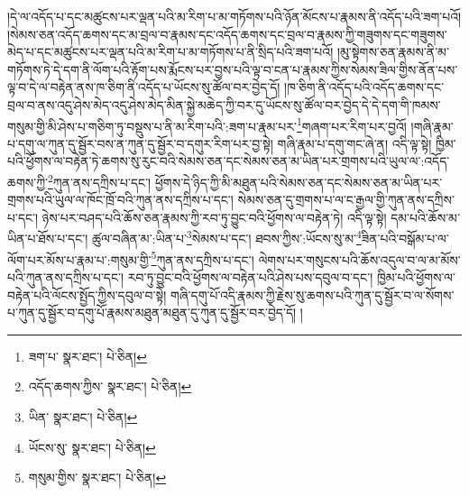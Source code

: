 །དེ་ལ་འདོད་པ་དང་མཚུངས་པར་ལྡན་པའི་མ་རིག་པ་མ་གཏོགས་པའི་ཉོན་མོངས་པ་རྣམས་ནི་འདོད་པའི་ཟག་པའོ། །སེམས་ཅན་འདོད་ཆགས་དང་མ་བྲལ་བ་རྣམས་དང་འདོད་ཆགས་དང་བྲལ་བ་རྣམས་ཀྱི་གཟུགས་དང་གཟུགས་མེད་པ་དང་མཚུངས་པར་ལྡན་པའི་མ་རིག་པ་མ་གཏོགས་པ་ནི་སྲིད་པའི་ཟག་པའོ། །མུ་སྟེགས་ཅན་རྣམས་ནི་མ་གཏོགས་ཏེ་དེ་དག་ནི་ལོག་པའི་རྟོག་པས་རྨོངས་པར་བྱས་པའི་ལྟ་བ་ངན་པ་རྣམས་ཀྱིས་སེམས་ཟིལ་གྱིས་ནོན་པས་ལྟ་བ་དེ་ལ་བརྟེན་ནས་ཁ་ཅིག་ནི་འདོད་པ་ཡོངས་སུ་ཚོལ་བར་བྱེད་དོ། །ཁ་ཅིག་ནི་འདོད་པའི་འདོད་ཆགས་དང་བྲལ་བ་ནས་འདུ་ཤེས་མེད་འདུ་ཤེས་མེད་མིན་སྐྱེ་མཆེད་ཀྱི་བར་དུ་ཡོངས་སུ་ཚོལ་བར་བྱེད་དེ་དེ་དག་གི་ཁམས་གསུམ་གྱི་མི་ཤེས་པ་གཅིག་ཏུ་བསྡུས་པ་ནི་མ་རིག་པའི་:ཟག་པ་རྣམ་པར་\footnote{ཟག་པ་  སྣར་ཐང་།  པེ་ཅིན། }གཞག་པར་རིག་པར་བྱའོ། །གཞི་རྣམ་པ་དགུ་ལ་ཀུན་དུ་སྦྱོར་བས་ན་ཀུན་དུ་སྦྱོར་བ་དགུར་རིག་པར་བྱ་སྟེ། གཞི་རྣམ་པ་དགུ་གང་ཞེ་ན། འདི་ལྟ་སྟེ། ཁྱིམ་པའི་ཕྱོགས་ལ་བརྟེན་ཏེ་ཆགས་སུ་རུང་བའི་སེམས་ཅན་དང་སེམས་ཅན་མ་ཡིན་པར་གྲགས་པའི་ཡུལ་ལ་:འདོད་ཆགས་ཀྱི་\footnote{འདོད་ཆགས་ཀྱིས་  སྣར་ཐང་།  པེ་ཅིན། }ཀུན་ནས་དཀྲིས་པ་དང་། ཕྱོགས་དེ་ཉིད་ཀྱི་མི་མཐུན་པའི་སེམས་ཅན་དང་སེམས་ཅན་མ་ཡིན་པར་གྲགས་པའི་ཡུལ་ལ་ཁོང་ཁྲོ་བའི་ཀུན་ནས་དཀྲིས་པ་དང་། སེམས་ཅན་དུ་གྲགས་པ་ལ་ང་རྒྱལ་གྱི་ཀུན་ནས་དཀྲིས་པ་དང་། ཉེས་པར་བཤད་པའི་ཆོས་ཅན་རྣམས་ཀྱི་རབ་ཏུ་བྱུང་བའི་ཕྱོགས་ལ་བརྟེན་ཏེ། འདི་ལྟ་སྟེ། དམ་པའི་ཆོས་མ་ཡིན་པ་ཐོས་པ་དང་། ཚུལ་བཞིན་མ་:ཡིན་པ་\footnote{ཡིན་  སྣར་ཐང་།  པེ་ཅིན། }སེམས་པ་དང་། ཐབས་ཀྱིས་:ཡོངས་སུ་མ་\footnote{ཡོངས་སུ་  སྣར་ཐང་།  པེ་ཅིན། }ཟིན་པའི་བསྒོམ་པ་ལ་ལོག་པར་མོས་པ་རྣམ་པ་:གསུམ་གྱི་\footnote{གསུམ་གྱིས་  སྣར་ཐང་།  པེ་ཅིན། }ཀུན་ནས་དཀྲིས་པ་དང་། ལེགས་པར་གསུངས་པའི་ཆོས་འདུལ་བ་ལ་མ་མོས་པའི་ཀུན་ནས་དཀྲིས་པ་དང་། རབ་ཏུ་བྱུང་བའི་ཕྱོགས་ལ་བརྟེན་པའི་ཤེས་པས་དབུལ་བ་དང་། ཁྱིམ་པའི་ཕྱོགས་ལ་བརྟེན་པའི་ལོངས་སྤྱོད་ཀྱིས་དབུལ་བ་སྟེ། གཞི་དགུ་པོ་འདི་རྣམས་ཀྱི་རྗེས་སུ་ཆགས་པའི་ཀུན་དུ་སྦྱོར་བ་ལ་སོགས་པ་ཀུན་དུ་སྦྱོར་བ་དགུ་པོ་རྣམས་མཐུན་མཐུན་དུ་ཀུན་དུ་སྦྱོར་བར་བྱེད་དོ། །
